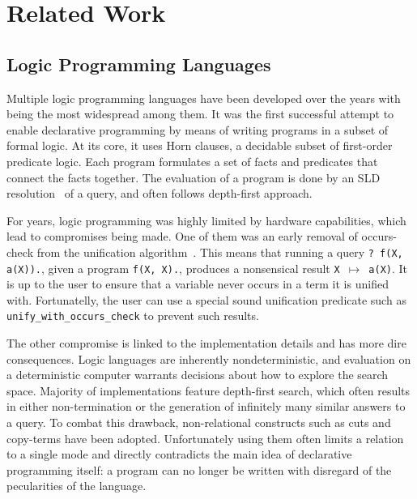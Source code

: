 \section{Related Work}

\subsection{Logic Programming Languages}

Multiple logic programming languages have been developed over the years with \prolog~\cite{battani1973interpreteur} being the most widespread among them. 
It was the first successful attempt to enable declarative programming by means of writing programs in a subset of formal logic.
At its core, it uses Horn clauses, a decidable subset of first-order predicate logic. 
Each program formulates a set of facts and predicates that connect the facts together. 
The evaluation of a program is done by an SLD resolution~\cite{robinson1965machine} of a query, and often follows depth-first approach.  

For years, logic programming was highly limited by hardware capabilities, which lead to compromises being made. 
One of them was an early removal of occurs-check from the unification algorithm~\cite{cohen1988view}. 
This means that running a query \texttt{? f(X, a(X)).}, given a program \texttt{f(X, X).}, produces a nonsensical result \texttt{X $\mapsto$ a(X)}. 
It is up to the user to ensure that a variable never occurs in a term it is unified with. 
Fortunatelly, the user can use a special sound unification predicate such as \texttt{unify\_with\_occurs\_check} to prevent such results. 

The other compromise is linked to the implementation details and has more dire consequences. 
Logic languages are inherently nondeterministic, and evaluation on a deterministic computer warrants decisions about how to explore the search space. 
Majority of \prolog implementations feature depth-first search, which often results in either non-termination or the generation of infinitely many similar answers to a query. 
To combat this drawback, non-relational constructs such as cuts and copy-terms have been adopted. 
Unfortunately using them often limits a relation to a single mode and directly contradicts the main idea of declarative programming itself: a program can no longer be written with disregard of the pecularities of the language. 

